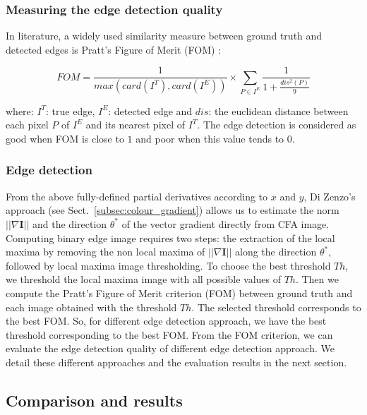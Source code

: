 \documentclass[twoside]{article}
\begin{document}
\subsubsection{Measuring the edge detection quality}
\label{Measuring the edge detection quality}
In literature, a widely used similarity measure between ground truth and detected edges is Pratt's Figure of Merit (FOM) \cite{abdou_pieee_1979}:

\begin{equation}
FOM = \frac{1}{max(card(I^T),card(I^E))} \times \sum_{P\in I^E}\frac{1}{1+\frac{dis^2(P)}{9}}
\end{equation}


where: $I^T$: true edge, $I^E$: detected edge and $dis$: the euclidean distance between each pixel $P$ of $I^E$ and  its nearest pixel of $I^T$.
The edge detection is considered as good when FOM is close to $1$ and poor when this value tends to $0$.


\subsubsection{Edge detection}
\label{Edge detection}
From the above fully-defined partial derivatives according to $x$ and $y$, Di Zenzo's approach (see Sect.~\ref{subsec:colour_gradient}) allows us to estimate the norm $||\nabla \mathbf{I}||$ and the direction $\theta^{*}$ of the vector gradient directly from CFA image.
Computing binary edge image requires two steps: the extraction of the local maxima by removing the non local maxima of $||\nabla \mathbf{I}||$ along the direction $\theta^{*}$, followed by local maxima image thresholding.
To choose the best threshold $Th$, we threshold the local maxima image with all possible values of $Th$. Then we compute the Pratt's Figure of Merit criterion (FOM) between ground truth  and each image obtained with the threshold $Th$. The selected threshold corresponds to the best FOM. So, for different edge detection approach, we have the best threshold corresponding to the best FOM. From the FOM criterion, we can evaluate the edge detection quality of different edge detection approach. We detail these different approaches and the evaluation results in the next section.       


\subsection{Comparison and results}
\label{subsec:Comparison and results}
\end{document}
